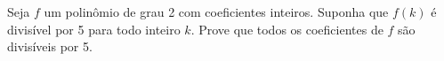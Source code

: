 Seja \( f \) um polinômio de grau 2 com coeficientes inteiros. Suponha que \( f(k) \) é divisível por 5 para todo inteiro \( k \). Prove que todos os coeficientes de \( f \) são divisíveis por 5.
